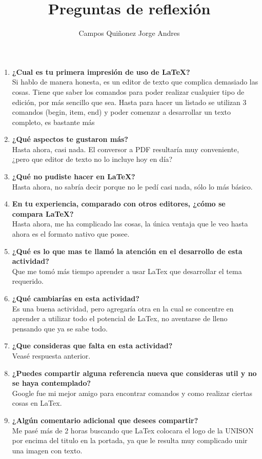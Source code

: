 \documentclass{article}
\begin{document}
\title{Preguntas de reflexión}
\author{Campos Quiñonez Jorge Andres}
\maketitle

\begin{enumerate}
\item \textbf{¿Cual es tu primera impresión de uso de LaTeX?}\\
Si hablo de manera honesta, es un editor de texto que complica demasiado las cosas. Tiene que saber los comandos para poder realizar cualquier tipo de edición, por más sencillo que sea. Hasta para hacer un listado se utilizan 3 comandos (begin, item, end) y poder comenzar a desarrollar un texto completo, es bastante más
\item \textbf{¿Qué aspectos te gustaron más?}\\
Hasta ahora, casi nada. El conversor a PDF resultaría muy conveniente, ¿pero que editor de texto no lo incluye hoy en día?
\item \textbf{¿Qué no pudiste hacer en LaTeX?}\\
Hasta ahora, no sabría decir porque no le pedí casi nada, sólo lo más básico.
\item \textbf{En tu experiencia, comparado con otros editores, ¿cómo se compara LaTeX? }\\
Hasta ahora, me ha complicado las cosas, la única ventaja que le veo hasta ahora es el formato nativo que posee.
\item \textbf{¿Qué es lo que mas te llamó la atención en el desarrollo de esta actividad?}\\
Que me tomó más tiempo aprender a usar LaTex que desarrollar el tema requerido.
\item \textbf{¿Qué cambiarías en esta actividad?}\\
Es una buena actividad, pero agregaría otra en la cual se concentre en aprender a utilizar todo el potencial de LaTex, no aventarse de lleno pensando que ya se sabe todo.
\item \textbf{¿Que consideras que falta en esta actividad? }\\
Veasé respuesta anterior.
\item \textbf{¿Puedes compartir alguna referencia nueva que consideras util y no se haya contemplado? }\\
Google fue mi mejor amigo para encontrar comandos y como realizar ciertas cosas en LaTex.
\item \textbf{¿Algún comentario adicional que desees compartir? }\\
Me pasé más de 2 horas buscando que LaTex colocara el logo de la UNISON por encima del titulo en la portada, ya que le resulta muy complicado unir una imagen con texto.
\end{enumerate}
\end{document}
